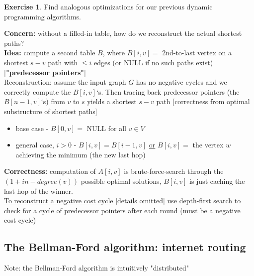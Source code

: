 \documentclass[a4paper,12pt]{article}
\theoremstyle{plain}
\theoremstyle{definition}
\newtheorem{problem}{Exercise}[section]
\theoremstyle{remark}
\begin{document}
\begin{problem}Find analogous optimizations for our previous dynamic programming algorithms.\end{problem}

\textbf{Concern:} without a filled-in table, how do we reconstruct the actual shortest paths?
\\

\textbf{Idea:} compute a second table $B$, where $B[i, v] =$ 2nd-to-last vertex on a shortest $s-v$ path with $\leq i$ edges (or NULL if no such paths exist) [\textbf{"predecessor pointers"}]
\\

Reconstruction: assume the input graph $G$ has no negative cycles and we correctly compute the $B[i, v]$`s. Then tracing back predecessor pointers (the $B[n-1,v]$`s) from $v$ to $s$ yields a shortest $s-v$ path [correctness from optimal substructure of shortest paths]

\begin{itemize}
	\item base case - $B[0, v] =$ NULL for all $v \in V$
	\item general case, $i > 0$ - $B[i, v] = B[i-1, v]$ \underline{or} $B[i, v] =$ the vertex $w$ achieving the minimum (the new last hop)
\end{itemize}

\textbf{Correctness:} computation of $A[i, v]$ is brute-force-search through the $(1 + in-degree(v))$ possible optimal solutions, $B[i, v]$ is just caching the last hop of the winner.
\\

\underline{To reconstruct a negative cost cycle} [details omitted] use depth-first search to check for a cycle of predecessor pointers after each round (must be a negative cost cycle)



\subsection{The Bellman-Ford algorithm: internet routing}
Note: the Bellman-Ford algorithm is intuitively "distributed"
\\
\end{document}
